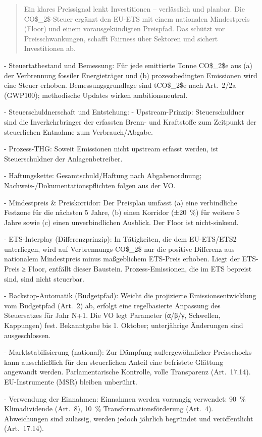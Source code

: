 \documentclass[12pt,a4paper]{scrartcl}
\begin{document}
\begin{quote}
  Ein klares Preissignal lenkt Investitionen -- verlässlich und planbar. Die CO\$\_2\$-Steuer ergänzt den EU-ETS mit einem nationalen Mindestpreis (Floor) und einem vorausgekündigten Preispfad. Das schützt vor Preisschwankungen, schafft Fairness über Sektoren und sichert Investitionen ab.
\end{quote}

- Steuertatbestand und Bemessung: Für jede emittierte Tonne CO\$\_2\$e aus (a) der Verbrennung fossiler Energieträger und (b) prozessbedingten Emissionen wird eine Steuer erhoben. Bemessungsgrundlage sind tCO\$\_2\$e nach Art. 2/2a (GWP100); methodische Updates wirken ambitionsneutral.

- Steuerschuldnerschaft und Entstehung:
- Upstream-Prinzip: Steuerschuldner sind die Inverkehrbringer der erfassten Brenn- und Kraftstoffe zum Zeitpunkt der steuerlichen Entnahme zum Verbrauch/Abgabe.

- Prozess-THG: Soweit Emissionen nicht upstream erfasst werden, ist Steuerschuldner der Anlagenbetreiber.

- Haftungskette: Gesamtschuld/Haftung nach Abgabenordnung; Nachweis-/Dokumentationspflichten folgen aus der VO.

- Mindestpreis \& Preiskorridor: Der Preisplan umfasst (a) eine verbindliche Festzone für die nächsten 5 Jahre, (b) einen Korridor (±20 \%) für weitere 5 Jahre sowie (c) einen unverbindlichen Ausblick. Der Floor ist nicht-sinkend.

- ETS-Interplay (Differenzprinzip): In Tätigkeiten, die dem EU-ETS/ETS2 unterliegen, wird auf Verbrennungs-CO\$\_2\$ nur die positive Differenz aus nationalem Mindestpreis minus maßgeblichem ETS-Preis erhoben. Liegt der ETS-Preis ≥ Floor, entfällt dieser Baustein. Prozess-Emissionen, die im ETS bepreist sind, sind nicht steuerbar.

- Backstop-Automatik (Budgetpfad): Weicht die projizierte Emissionsentwicklung vom Budgetpfad (Art. 2) ab, erfolgt eine regelbasierte Anpassung des Steuersatzes für Jahr N+1. Die VO legt Parameter (α/β/γ, Schwellen, Kappungen) fest. Bekanntgabe bis 1. Oktober; unterjährige Änderungen sind ausgeschlossen.

- Marktstabilisierung (national): Zur Dämpfung außergewöhnlicher Preisschocks kann ausschließlich für den steuerlichen Anteil eine befristete Glättung angewandt werden. Parlamentarische Kontrolle, volle Transparenz (Art. 17.14). EU-Instrumente (MSR) bleiben unberührt.

- Verwendung der Einnahmen: Einnahmen werden vorrangig verwendet: 90 \% Klimadividende (Art. 8), 10 \% Transformationsförderung (Art. 4). Abweichungen sind zulässig, werden jedoch jährlich begründet und veröffentlicht (Art. 17.14).
\end{document}
